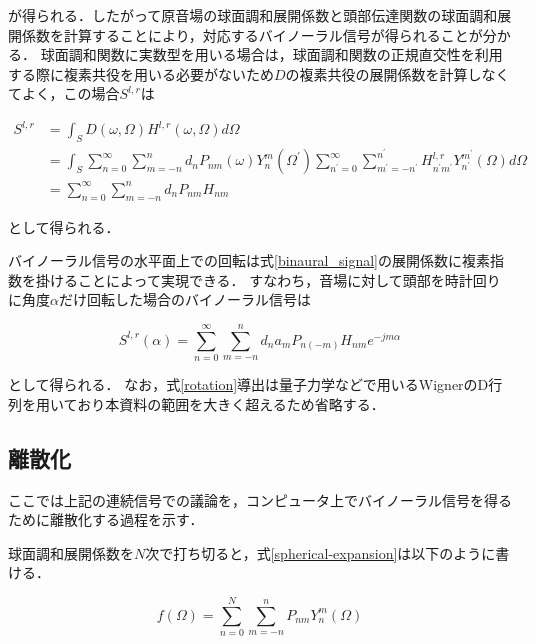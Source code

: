 \documentclass[a4paper]{jsarticle}
\begin{document}
が得られる．したがって原音場の球面調和展開係数と頭部伝達関数の球面調和展開係数を計算することにより，対応するバイノーラル信号が得られることが分かる．
球面調和関数に実数型を用いる場合は，球面調和関数の正規直交性を利用する際に複素共役を用いる必要がないため$D$の複素共役の展開係数を計算しなくてよく，この場合$S^{l, r}$は

\begin{equation}
    \begin{aligned}
        S^{l, r} & =\int_{S} D(\omega, \Omega)H^{l, r}(\omega, \Omega)  d \Omega                                                                                                                                                                                                \\
                 & =\int_{S}\sum_{n=0}^{\infty} \sum_{m=-n}^{n} d_{n} P_{n m}(\omega) Y_{n}^{m}\left(\Omega^{\prime}\right)\sum_{n^{\prime}=0}^{\infty} \sum_{m^{\prime}=-n^{\prime}}^{n^{\prime}} H_{n^{\prime} m^{\prime}}^{l,r} Y_{n^{\prime}}^{m^{\prime}}(\Omega) d \Omega \\
                 & =\sum_{n=0}^{\infty} \sum_{m=-n}^{n} d_{n} P_{n m} H_{n m}
    \end{aligned}
\end{equation}

として得られる．

バイノーラル信号の水平面上での回転は式\ref{binaural_signal}の展開係数に複素指数を掛けることによって実現できる．
すなわち，音場に対して頭部を時計回りに角度$\alpha$だけ回転した場合のバイノーラル信号は

\begin{equation}
    \label{rotation}
    S^{l, r}(\alpha)=\sum_{n=0}^{\infty} \sum_{m=-n}^{n} d_{n} a_{m} P_{n(-m)} H_{n m} e^{-j m \alpha}
\end{equation}

として得られる．
なお，式\ref{rotation}導出は量子力学などで用いるWignerのD行列を用いており\cite{Bernschutz2016-be}本資料の範囲を大きく超えるため省略する．

\subsection{離散化}

ここでは上記の連続信号での議論を，コンピュータ上でバイノーラル信号を得るために離散化する過程を示す．

球面調和展開係数を$N$次で打ち切ると，式\ref{spherical-expansion}は以下のように書ける．

$$
    f(\Omega)=\sum_{n=0}^{N} \sum_{m=-n}^{n} P_{n m} Y_{n}^{m}(\Omega)
$$
\end{document}
